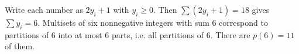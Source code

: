 Write each number as $2y_i+1$ with $y_i\ge0$. Then $\sum(2y_i+1)=18$ gives $\sum y_i=6$. Multisets of six nonnegative integers with sum $6$ correspond to partitions of $6$ into at most $6$ parts, i.e. all partitions of $6$. There are $p(6)=\boxed{11}$ of them.
